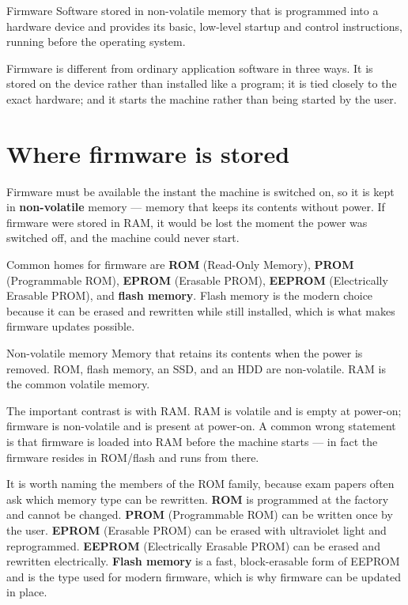 \begin{definitionbox}{Firmware}
Software stored in non-volatile memory that is programmed into a hardware
device and provides its basic, low-level startup and control instructions,
running before the operating system.
\end{definitionbox}

Firmware is different from ordinary application software in three ways. It is
stored on the device rather than installed like a program; it is tied closely
to the exact hardware; and it starts the machine rather than being started by
the user.

\section{Where firmware is stored}
Firmware must be available the instant the machine is switched on, so it is
kept in \textbf{non-volatile} memory --- memory that keeps its contents
without power. If firmware were stored in RAM, it would be lost the moment
the power was switched off, and the machine could never start.

Common homes for firmware are \textbf{ROM} (Read-Only Memory), \textbf{PROM}
(Programmable ROM), \textbf{EPROM} (Erasable PROM), \textbf{EEPROM}
(Electrically Erasable PROM), and \textbf{flash memory}. Flash memory is the
modern choice because it can be erased and rewritten while still installed,
which is what makes firmware updates possible.

\begin{definitionbox}{Non-volatile memory}
Memory that retains its contents when the power is removed. ROM, flash
memory, an SSD, and an HDD are non-volatile. RAM is the common volatile
memory.
\end{definitionbox}

The important contrast is with RAM. RAM is volatile and is empty at
power-on; firmware is non-volatile and is present at power-on. A common wrong
statement is that firmware is loaded into RAM before the machine starts --- in
fact the firmware resides in ROM/flash and runs from there.

It is worth naming the members of the ROM family, because exam papers often
ask which memory type can be rewritten. \textbf{ROM} is programmed at the
factory and cannot be changed. \textbf{PROM} (Programmable ROM) can be
written once by the user. \textbf{EPROM} (Erasable PROM) can be erased with
ultraviolet light and reprogrammed. \textbf{EEPROM} (Electrically Erasable
PROM) can be erased and rewritten electrically. \textbf{Flash memory} is a
fast, block-erasable form of EEPROM and is the type used for modern firmware,
which is why firmware can be updated in place.

